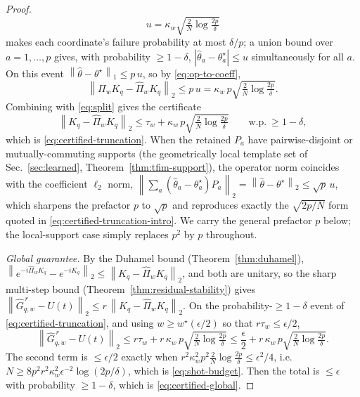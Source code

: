\documentclass[aps,prresearch,reprint,superscriptaddress,nofootinbib,amsmath,amssymb]{revtex4-2}
\newcommand{\norm}[1]{\left\lVert #1 \right\rVert}
\newcommand{\abs}[1]{\left\lvert #1 \right\rvert}
\begin{document}
\begin{proof}
\begin{equation*}
    u=\kappa_w\sqrt{\tfrac2N\log\tfrac{2p}{\delta}}
\end{equation*}
makes each coordinate's failure probability at most $\delta/p$; a union bound over $a=1,\dots,p$ gives, with probability $\geq1-\delta$, $\abs{\hat\theta_a-\theta_a^\star}\leq u$ simultaneously for all $a$. On this event $\norm{\hat\theta-\theta^\star}_1\leq p\,u$, so by \eqref{eq:op-to-coeff},
\begin{equation*}
    \norm{\Pi_wK_q-\widehat\Pi_wK_q}_2\leq p\,u=\kappa_w\,p\sqrt{\tfrac2N\log\tfrac{2p}\delta}.
\end{equation*}
Combining with \eqref{eq:split} gives the certificate
\begin{equation*}
    \norm{K_q-\widehat\Pi_wK_q}_2\leq\tau_w+\kappa_w\,p\sqrt{\tfrac2N\log\tfrac{2p}\delta}
    \qquad\text{w.p.}\ \geq1-\delta,
\end{equation*}
which is \eqref{eq:certified-truncation}. When the retained $P_a$ have pairwise-disjoint or mutually-commuting supports (the geometrically local template set of Sec.~\ref{sec:learned}, Theorem~\ref{thm:tfim-support}), the operator norm coincides with the coefficient $\ell_2$ norm, $\norm{\sum_a(\hat\theta_a-\theta^\star_a)P_a}_2=\norm{\hat\theta-\theta^\star}_2\leq\sqrt p\,u$, which sharpens the prefactor $p$ to $\sqrt p$ and reproduces exactly the $\sqrt{2p/N}$ form quoted in \eqref{eq:certified-truncation-intro}. We carry the general prefactor $p$ below; the local-support case simply replaces $p^2$ by $p$ throughout.

\emph{Global guarantee.} By the Duhamel bound (Theorem~\ref{thm:duhamel}), $\norm{e^{-i\widehat\Pi_wK_q}-e^{-iK_q}}_2\leq\norm{K_q-\widehat\Pi_wK_q}_2$, and both are unitary, so the sharp multi-step bound (Theorem~\ref{thm:residual-stability}) gives $\norm{\widehat G_{q,w}^{\,r}-U(t)}_2\leq r\,\norm{K_q-\widehat\Pi_wK_q}_2$. On the probability-$\geq1-\delta$ event of \eqref{eq:certified-truncation}, and using $w\geq w^\star(\epsilon/2)$ so that $r\tau_w\leq\epsilon/2$,
\begin{equation*}
    \norm{\widehat G_{q,w}^{\,r}-U(t)}_2\leq r\tau_w+r\,\kappa_w\,p\sqrt{\tfrac{2}N\log\tfrac{2p}\delta}\leq\frac\epsilon2+r\,\kappa_w\,p\sqrt{\tfrac{2}N\log\tfrac{2p}\delta}.
\end{equation*}
The second term is $\leq\epsilon/2$ exactly when $r^2\kappa_w^2p^2\tfrac{2}N\log\tfrac{2p}\delta\leq\epsilon^2/4$, i.e.\ $N\geq8p^2r^2\kappa_w^2\epsilon^{-2}\log(2p/\delta)$, which is \eqref{eq:shot-budget}. Then the total is $\leq\epsilon$ with probability $\geq1-\delta$, which is \eqref{eq:certified-global}.
\end{proof}
\end{document}
